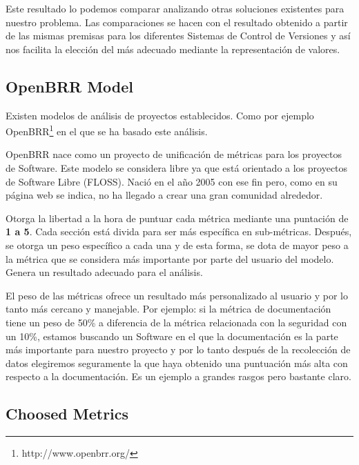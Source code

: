 \documentclass[11pt]{scrartcl}
\begin{document}
\par Este resultado lo podemos comparar analizando otras soluciones existentes para nuestro problema.
Las comparaciones se hacen con el resultado obtenido a partir de las mismas premisas para los diferentes Sistemas de Control de Versiones y as\'i nos facilita la elecci\'on del m\'as adecuado mediante la representaci\'on de valores.

\subsection{OpenBRR Model}

\par Existen modelos de an\'alisis de proyectos establecidos. Como por ejemplo OpenBRR\footnote{http://www.openbrr.org/} en el que se ha basado este an\'alisis. 

\par OpenBRR nace como un proyecto de unificaci\'on de m\'etricas para los proyectos de Software. Este modelo se considera libre ya que est\'a orientado a los proyectos de Software Libre (FLOSS). Naci\'o en el a\~no 2005 con ese fin pero, como en su p\'agina web se indica, no ha llegado a crear una gran comunidad alrededor.

\par Otorga la libertad a la hora de puntuar cada m\'etrica mediante una puntaci\'on de \textbf{1 a 5}. Cada secci\'on est\'a divida para ser m\'as espec\'ifica en sub-m\'etricas. Despu\'es, se otorga un peso espec\'ifico a cada una y de esta forma, se dota de mayor peso a la m\'etrica que se considera m\'as importante por parte del usuario del modelo. Genera un resultado adecuado para el an\'alisis.

\par El peso de las m\'etricas ofrece un resultado m\'as personalizado al usuario y por lo tanto m\'as cercano y manejable. Por ejemplo: si la m\'etrica de documentaci\'on tiene un peso de 50\% a diferencia de la m\'etrica relacionada con la seguridad con un 10\%, estamos buscando un Software en el que la documentaci\'on es la parte m\'as importante para nuestro proyecto y por lo tanto despu\'es de la recolecci\'on de datos elegiremos seguramente la que haya obtenido una puntuaci\'on m\'as alta con respecto a la documentaci\'on. Es un ejemplo a grandes rasgos pero bastante claro.

\subsection{Choosed Metrics}
\end{document}
